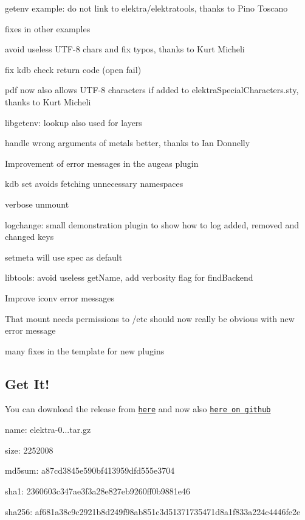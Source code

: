 \begin{DoxyItemize}
\item getenv example\+: do not link to elektra/elektratools, thanks to Pino Toscano
\item fixes in other examples
\item avoid useless U\+T\+F-\/8 chars and fix typos, thanks to Kurt Micheli
\item fix kdb check return code (open fail)
\item pdf now also allows U\+T\+F-\/8 characters if added to elektra\+Special\+Characters.\+sty, thanks to Kurt Micheli
\item libgetenv\+: lookup also used for layers
\item handle wrong arguments of metals better, thanks to Ian Donnelly
\item Improvement of error messages in the augeas plugin
\item {\ttfamily kdb set} avoids fetching unnecessary namespaces
\item verbose unmount
\item logchange\+: small demonstration plugin to show how to log added, removed and changed keys
\item setmeta will use spec as default
\item libtools\+: avoid useless get\+Name, add verbosity flag for find\+Backend
\item Improve iconv error messages
\item That mount needs permissions to /etc should now really be obvious with new error message
\item many fixes in the template for new plugins
\end{DoxyItemize}

\subsection*{Get It!}

You can download the release from \href{https://www.libelektra.org/ftp/elektra/releases/elektra-0.8.14.tar.gz}{\tt here} and now also \href{https://github.com/ElektraInitiative/ftp/tree/master/releases/elektra-0.8.14.tar.gz}{\tt here on github}


\begin{DoxyItemize}
\item name\+: elektra-\/0...\+tar.\+gz
\item size\+: 2252008
\item md5sum\+: a87cd3845e590bf413959dfd555e3704
\item sha1\+: 2360603c347ae3f3a28e827eb9260ff0b9881e46
\item sha256\+: af681a38c9c2921b8d249f98ab851c3d51371735471d8a1f833a224c4446fe2e
\end{DoxyItemize}

